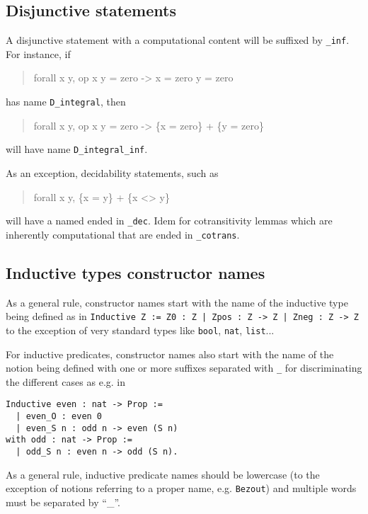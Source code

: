 \documentclass[a4paper]{article}
\newcommand\name[1]{\texttt{#1}}
\begin{document}
\subsection{Disjunctive statements}

A disjunctive statement with a computational content will be suffixed
by \name{\_inf}. For instance, if

\begin{quote}
\begin{tt}
{forall x y, op x y = zero -> x = zero \/ y = zero}
\end{tt}
\end{quote}
has name \texttt{D\_integral}, then
\begin{quote}
\begin{tt}
{forall x y, op x y = zero -> \{x = zero\} + \{y = zero\}}
\end{tt}
\end{quote}
will have name \texttt{D\_integral\_inf}.

As an exception, decidability statements, such as
\begin{quote}
\begin{tt}
{forall x y, \{x = y\} + \{x <> y\}}
\end{tt}
\end{quote}
will have a named ended in \texttt{\_dec}. Idem for cotransitivity
lemmas which are inherently computational that are ended in
\texttt{\_cotrans}.

\subsection{Inductive types constructor names}

As a general rule, constructor names start with the name of the
inductive type being defined as in \texttt{Inductive Z := Z0 : Z |
  Zpos : Z -> Z | Zneg : Z -> Z} to the exception of very standard
types like \texttt{bool}, \texttt{nat}, \texttt{list}...

For inductive predicates, constructor names also start with the name
of the notion being defined with one or more suffixes separated with
\texttt{\_} for discriminating the different cases as e.g. in

\begin{verbatim}
Inductive even : nat -> Prop :=
  | even_O : even 0
  | even_S n : odd n -> even (S n)
with odd : nat -> Prop :=
  | odd_S n : even n -> odd (S n).
\end{verbatim}

As a general rule, inductive predicate names should be lowercase (to
the exception of notions referring to a proper name, e.g. \texttt{Bezout})
and multiple words must be separated by ``{\_}''.
\end{document}
